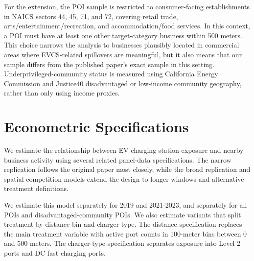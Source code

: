 \documentclass[12pt]{article}
\begin{document}
For the extension, the POI sample is restricted to consumer-facing establishments in NAICS sectors 44, 45, 71, and 72, covering retail trade, arts/entertainment/recreation, and accommodation/food services. In this context, a POI must have at least one other target-category business within 500 meters. This choice narrows the analysis to businesses plausibly located in commercial areas where EVCS-related spillovers are meaningful, but it also means that our sample differs from the published paper’s exact sample in this setting. Underprivileged-community status is measured using California Energy Commission and Justice40 disadvantaged or low-income community geography, rather than only using income proxies.



\section{Econometric Specifications}

We estimate the relationship between EV charging station exposure and nearby business activity using several related panel-data specifications. The narrow replication follows the original paper most closely, while the broad replication and spatial competition models extend the design to longer windows and alternative treatment definitions.

We estimate this model separately for 2019 and 2021-2023, and separately for all POIs and disadvantaged-community POIs. We also estimate variants that split treatment by distance bin and charger type. The distance specification replaces the main treatment variable with active port counts in 100-meter bins between 0 and 500 meters. The charger-type specification separates exposure into Level 2 ports and DC fast charging ports.
\end{document}
